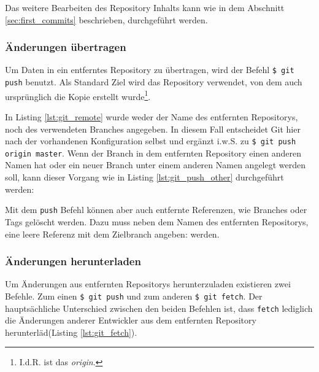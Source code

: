 Das weitere Bearbeiten des Repository Inhalts kann wie in dem Abschnitt
\ref{sec:first_commits} beschrieben, durchgeführt werden.

\subsubsection{Änderungen übertragen}
Um Daten in ein entferntes Repository zu übertragen, wird der Befehl \texttt{\$
git push} benutzt. Als Standard Ziel wird das Repository verwendet, von dem auch
ursprünglich die Kopie erstellt wurde\footnote{I.d.R. ist das \textit{origin}.}.



In Listing \ref{lst:git_remote} wurde weder der Name des entfernten Repositorys,
noch des verwendeten Branches angegeben. In diesem Fall entscheidet Git hier
nach der vorhandenen Konfiguration selbst und ergänzt i.w.S. zu \texttt{\$ git
push origin master}. Wenn der Branch in dem entfernten Repository einen anderen
Namen hat oder ein neuer Branch unter einem anderen Namen angelegt werden soll,
kann dieser Vorgang wie in Listing \ref{lst:git_push_other} durchgeführt werden:



Mit dem \texttt{push} Befehl können aber auch entfernte Referenzen, wie
Branches oder Tags gelöscht werden. Dazu muss neben dem Namen des entfernten
Repositorys, eine leere Referenz mit dem Zielbranch angeben:
werden.\cite[S.~153-155]{gitosp}



\subsubsection{Änderungen herunterladen}
Um Änderungen aus entfernten Repositorys herunterzuladen existieren zwei
Befehle. Zum einen \texttt{\$ git push} und zum anderen \texttt{\$ git fetch}.
Der hauptsächliche Unterschied zwischen den beiden Befehlen ist, dass
\texttt{fetch} lediglich die Änderungen anderer Entwickler aus dem entfernten
Repository herunterläd(Listing \ref{lst:git_fetch}).



